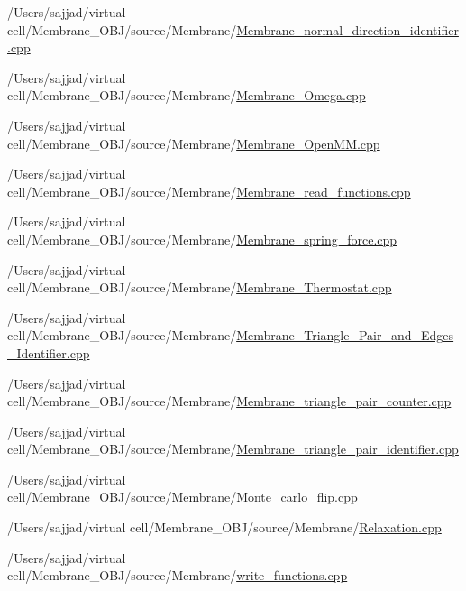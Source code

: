 \begin{DoxyCompactItemize}
/\+Users/sajjad/virtual cell/\+Membrane\+\_\+\+O\+B\+J/source/\+Membrane/\mbox{\hyperlink{Membrane__normal__direction__identifier_8cpp}{Membrane\+\_\+normal\+\_\+direction\+\_\+identifier.\+cpp}}\item 
/\+Users/sajjad/virtual cell/\+Membrane\+\_\+\+O\+B\+J/source/\+Membrane/\mbox{\hyperlink{Membrane__Omega_8cpp}{Membrane\+\_\+\+Omega.\+cpp}}\item 
/\+Users/sajjad/virtual cell/\+Membrane\+\_\+\+O\+B\+J/source/\+Membrane/\mbox{\hyperlink{Membrane__OpenMM_8cpp}{Membrane\+\_\+\+Open\+M\+M.\+cpp}}\item 
/\+Users/sajjad/virtual cell/\+Membrane\+\_\+\+O\+B\+J/source/\+Membrane/\mbox{\hyperlink{Membrane__read__functions_8cpp}{Membrane\+\_\+read\+\_\+functions.\+cpp}}\item 
/\+Users/sajjad/virtual cell/\+Membrane\+\_\+\+O\+B\+J/source/\+Membrane/\mbox{\hyperlink{Membrane__spring__force_8cpp}{Membrane\+\_\+spring\+\_\+force.\+cpp}}\item 
/\+Users/sajjad/virtual cell/\+Membrane\+\_\+\+O\+B\+J/source/\+Membrane/\mbox{\hyperlink{Membrane__Thermostat_8cpp}{Membrane\+\_\+\+Thermostat.\+cpp}}\item 
/\+Users/sajjad/virtual cell/\+Membrane\+\_\+\+O\+B\+J/source/\+Membrane/\mbox{\hyperlink{Membrane__Triangle__Pair__and__Edges__Identifier_8cpp}{Membrane\+\_\+\+Triangle\+\_\+\+Pair\+\_\+and\+\_\+\+Edges\+\_\+\+Identifier.\+cpp}}\item 
/\+Users/sajjad/virtual cell/\+Membrane\+\_\+\+O\+B\+J/source/\+Membrane/\mbox{\hyperlink{Membrane__triangle__pair__counter_8cpp}{Membrane\+\_\+triangle\+\_\+pair\+\_\+counter.\+cpp}}\item 
/\+Users/sajjad/virtual cell/\+Membrane\+\_\+\+O\+B\+J/source/\+Membrane/\mbox{\hyperlink{Membrane__triangle__pair__identifier_8cpp}{Membrane\+\_\+triangle\+\_\+pair\+\_\+identifier.\+cpp}}\item 
/\+Users/sajjad/virtual cell/\+Membrane\+\_\+\+O\+B\+J/source/\+Membrane/\mbox{\hyperlink{Monte__carlo__flip_8cpp}{Monte\+\_\+carlo\+\_\+flip.\+cpp}}\item 
/\+Users/sajjad/virtual cell/\+Membrane\+\_\+\+O\+B\+J/source/\+Membrane/\mbox{\hyperlink{Relaxation_8cpp}{Relaxation.\+cpp}}\item 
/\+Users/sajjad/virtual cell/\+Membrane\+\_\+\+O\+B\+J/source/\+Membrane/\mbox{\hyperlink{Membrane_2write__functions_8cpp}{write\+\_\+functions.\+cpp}}\end{DoxyCompactItemize}
